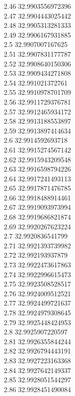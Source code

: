 {2.46	32.9903556972396\\
2.47	32.9904443025442\\
2.48	32.9905313281333\\
2.49	32.9906167931885\\
2.5	32.9907007167625\\
2.51	32.9907831177787\\
2.52	32.9908640150306\\
2.53	32.9909434271808\\
2.54	32.991021372761\\
2.55	32.9910978701709\\
2.56	32.9911729376781\\
2.57	32.9912465934172\\
2.58	32.9913188553897\\
2.59	32.9913897414634\\
2.6	32.9914592693718\\
2.61	32.9915274567142\\
2.62	32.9915943209548\\
2.63	32.9916598794226\\
2.64	32.9917241493113\\
2.65	32.9917871476785\\
2.66	32.9918488914461\\
2.67	32.9919093973994\\
2.68	32.9919686821874\\
2.69	32.9920267623224\\
2.7	32.9920836541799\\
2.71	32.9921393739982\\
2.72	32.992193937879\\
2.73	32.9922473617863\\
2.74	32.9922996615473\\
2.75	32.9923508528517\\
2.76	32.9924009512521\\
2.77	32.9924499721637\\
2.78	32.9924979308645\\
2.79	32.9925448424953\\
2.8	32.9925907220597\\
2.81	32.9926355844244\\
2.82	32.9926794443191\\
2.83	32.9927223163368\\
2.84	32.9927642149337\\
2.85	32.9928051544297\\
2.86	32.9928451490084\\
}
